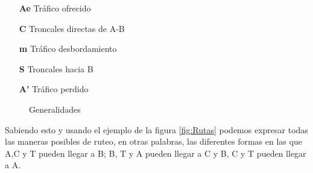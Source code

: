 \documentclass[11pt,fleqn]{book} %
\begin{document}
\begin{itemize}
\item[\textbf{Ae}] Tráfico ofrecido
\item[\textbf{C}] Troncales directas de A-B
\item[\textbf{m}]  Tráfico desbordamiento
\item[\textbf{S}] Troncales hacia B
\item[\textbf{A'}] Tráfico perdido
\end{itemize}
\begin{figure}[h!]
\centering
{}
\caption{Generalidades}
\end{figure}
Sabiendo esto y usando el ejemplo de la figura \ref{fig:Rutas} podemos expresar todas las maneras posibles de ruteo, en otras palabras, las diferentes formas en las que A,C y T pueden llegar a B; B, T y A pueden llegar a C y B, C y T pueden llegar a A.
\end{document}
